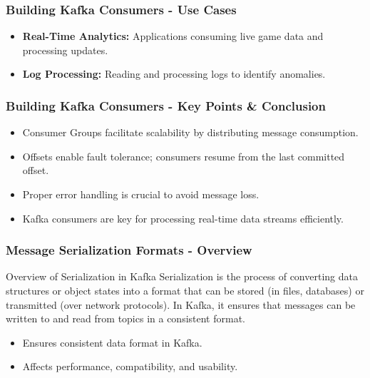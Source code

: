 \documentclass[aspectratio=169]{beamer}
\begin{document}
\begin{frame}[fragile]
    \frametitle{Building Kafka Consumers - Use Cases}
    \begin{itemize}
        \item \textbf{Real-Time Analytics:} Applications consuming live game data and processing updates.
        \item \textbf{Log Processing:} Reading and processing logs to identify anomalies.
    \end{itemize}
\end{frame}

\begin{frame}[fragile]
    \frametitle{Building Kafka Consumers - Key Points & Conclusion}
    \begin{itemize}
        \item Consumer Groups facilitate scalability by distributing message consumption.
        \item Offsets enable fault tolerance; consumers resume from the last committed offset.
        \item Proper error handling is crucial to avoid message loss.
        \item Kafka consumers are key for processing real-time data streams efficiently.
    \end{itemize}
\end{frame}

\begin{frame}[fragile]
    \frametitle{Message Serialization Formats - Overview}
    \begin{block}{Overview of Serialization in Kafka}
        Serialization is the process of converting data structures or object states into a format that can be stored (in files, databases) or transmitted (over network protocols). In Kafka, it ensures that messages can be written to and read from topics in a consistent format. 
    \end{block}
    
    \begin{itemize}
        \item Ensures consistent data format in Kafka.
        \item Affects performance, compatibility, and usability.
    \end{itemize}
\end{frame}
\end{document}
